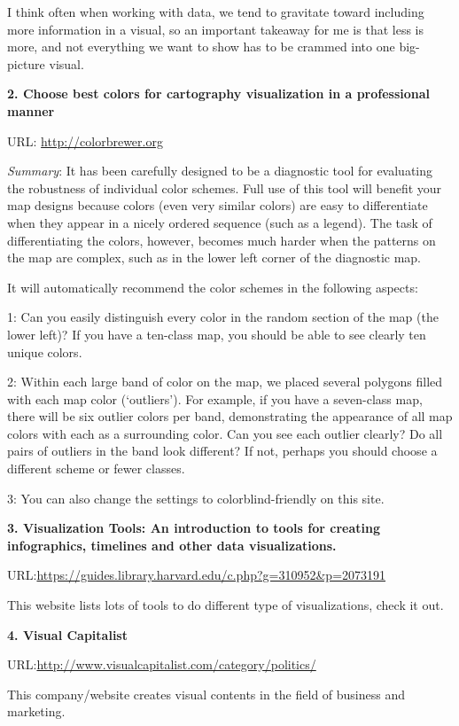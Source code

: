\documentclass[]{book}
\theoremstyle{definition}
\theoremstyle{definition}
\theoremstyle{definition}
\theoremstyle{remark}
\begin{document}
I think often when working with data, we tend to gravitate toward
including more information in a visual, so an important takeaway for me
is that less is more, and not everything we want to show has to be
crammed into one big-picture visual.

\textbf{2. Choose best colors for cartography visualization in a
professional manner}

URL: \url{http://colorbrewer.org}

\emph{Summary}: It has been carefully designed to be a diagnostic tool
for evaluating the robustness of individual color schemes. Full use of
this tool will benefit your map designs because colors (even very
similar colors) are easy to differentiate when they appear in a nicely
ordered sequence (such as a legend). The task of differentiating the
colors, however, becomes much harder when the patterns on the map are
complex, such as in the lower left corner of the diagnostic map.

It will automatically recommend the color schemes in the following
aspects:

1: Can you easily distinguish every color in the random section of the
map (the lower left)? If you have a ten-class map, you should be able to
see clearly ten unique colors.

2: Within each large band of color on the map, we placed several
polygons filled with each map color (`outliers'). For example, if you
have a seven-class map, there will be six outlier colors per band,
demonstrating the appearance of all map colors with each as a
surrounding color. Can you see each outlier clearly? Do all pairs of
outliers in the band look different? If not, perhaps you should choose a
different scheme or fewer classes.

3: You can also change the settings to colorblind-friendly on this site.

\textbf{3. Visualization Tools: An introduction to tools for creating
infographics, timelines and other data visualizations.}

URL:\url{https://guides.library.harvard.edu/c.php?g=310952\&p=2073191}

This website lists lots of tools to do different type of visualizations,
check it out.

\textbf{4. Visual Capitalist}

URL:\url{http://www.visualcapitalist.com/category/politics/}

This company/website creates visual contents in the field of business
and marketing.
\end{document}
